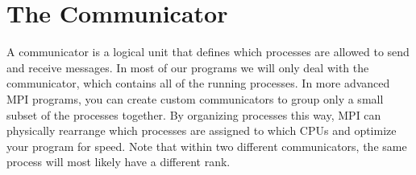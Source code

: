   \section*{The Communicator}
    A communicator is a logical unit that defines which processes are allowed to send and receive messages. In most of our programs we will only deal with the  communicator, which contains all of the running processes. In more advanced MPI programs, you can create custom communicators to group only a small subset of the processes together. By organizing processes this way, MPI can physically rearrange which processes are assigned to which CPUs and optimize your program for speed. Note that within two different communicators, the same process will most likely have a different rank.









